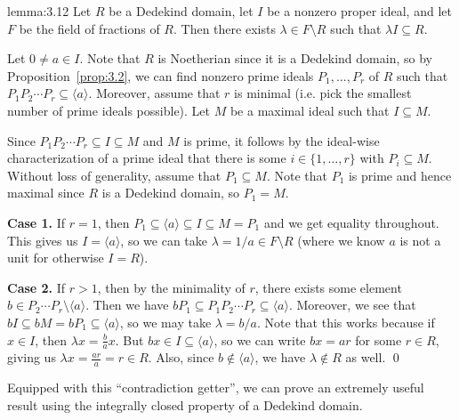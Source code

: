 \begin{lemma}{lemma:3.12}
    Let $R$ be a Dedekind domain, let $I$ be a nonzero proper ideal, and 
    let $F$ be the field of fractions of $R$. Then there exists 
    $\lambda \in F \setminus R$ such that $\lambda I \subseteq R$.     
\end{lemma}\vspace{-0.25cm}
\begin{pf}
    Let $0 \neq a \in I$. Note that $R$ is Noetherian since it is a Dedekind 
    domain, so by Proposition~\ref{prop:3.2}, we can find nonzero 
    prime ideals $P_1, \dots, P_r$ of $R$ such that $P_1 P_2 \cdots P_r 
    \subseteq \langle a \rangle$. Moreover, assume that $r$ is minimal
    (i.e. pick the smallest number of prime ideals possible). Let 
    $M$ be a maximal ideal such that $I \subseteq M$. 

    Since $P_1 P_2 \cdots P_r \subseteq I \subseteq M$ and $M$ is prime, 
    it follows by the ideal-wise characterization of a prime ideal 
    that there is some $i \in \{1, \dots, r\}$ with $P_i \subseteq M$. 
    Without loss of generality, assume that $P_1 \subseteq M$. Note that 
    $P_1$ is prime and hence maximal since $R$ is a Dedekind domain, so 
    $P_1 = M$. 

    {\bf Case 1.} If $r = 1$, then $P_1 \subseteq \langle a \rangle 
    \subseteq I \subseteq M = P_1$ and we get equality throughout. 
    This gives us $I = \langle a \rangle$, so we can take 
    $\lambda = 1/a \in F \setminus R$ (where we know $a$ is not a unit 
    for otherwise $I = R$).

    {\bf Case 2.} If $r > 1$, then by the minimality of $r$, there exists 
    some element $b \in P_2 \cdots P_r \setminus \langle a \rangle$. Then we have 
    $bP_1 \subseteq P_1 P_2 \cdots P_r \subseteq \langle a \rangle$. Moreover, we see that 
    $bI \subseteq bM = bP_1 \subseteq \langle a \rangle$, so we may 
    take $\lambda = b/a$. Note that this works because if $x \in I$, then 
    $\lambda x = \frac{b}{a} x$. But $bx \in I \subseteq \langle a \rangle$, 
    so we can write $bx = ar$ for some $r \in R$, giving us $\lambda x = 
    \frac{ar}{a} = r \in R$. Also, since $b \notin \langle a \rangle$, 
    we have $\lambda \notin R$ as well. \qed 
\end{pf}\vspace{-0.25cm}

Equipped with this ``contradiction getter'', we can prove an extremely useful result
using the integrally closed property of a Dedekind domain. 

